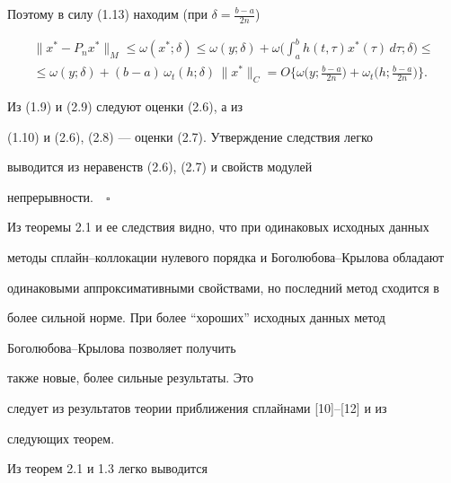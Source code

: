 Поэтому в силу (1.13) находим (при $\delta=\frac{b-a}{2n}$)


\begin{multline}


\|x^*-P_nx^*\|_M\leq \omega(x^*;\delta)\leq \omega(y;\delta)+


\omega\bigg(\int_a^bh(t,\tau)x^*(\tau)\, d\tau;\delta\bigg)\leq \\


%


\leq \omega(y;\delta)+ (b-a)\, \omega_t(h;\delta)\, \|x^*\|_C=


O\bigg\{ \omega\bigg( y;\frac{b-a}{2n}\bigg) +\omega_t\bigg( h;


\frac{b-a}{2n}\bigg)\bigg\} .


\end{multline}


Из (1.9) и (2.9) следуют оценки (2.6), а из


(1.10) и (2.6), (2.8) --- оценки (2.7). Утверждение следствия легко


выводится из неравенств (2.6), (2.7) и свойств модулей


непрерывности.$\quad\square$





Из теоремы 2.1 и ее следствия видно, что при одинаковых исходных данных


методы сплайн--коллокации нулевого порядка и Боголюбова--Крылова обладают


одинаковыми аппроксимативными свойствами, но последний метод сходится в


более сильной норме. При более ``хороших'' исходных данных метод


Боголюбова--Крылова позволяет получить 


также новые, более сильные результаты. Это


следует из результатов теории приближения сплайнами [10]--[12] и из


следующих теорем.





Из теорем 2.1 и 1.3 легко выводится





